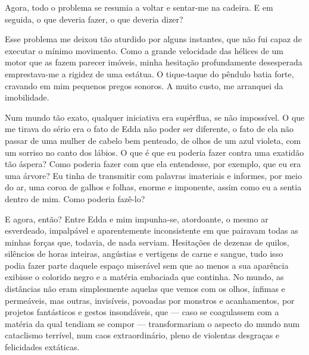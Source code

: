 Agora, todo o problema se resumia a voltar e sentar-me na cadeira. E em
seguida, o que deveria fazer, o que deveria dizer?

Esse problema me deixou tão aturdido por alguns instantes, que não fui capaz
de executar o mínimo movimento. Como a grande velocidade das hélices de um
motor que as fazem parecer imóveis, minha hesitação profundamente desesperada
emprestava-me a rigidez de uma estátua. O tique-taque do pêndulo batia forte,
cravando em mim pequenos pregos sonoros. A muito custo, me arranquei da
imobilidade. 


Num mundo tão exato, qualquer iniciativa era supérflua, se não impossível. O
que me tirava do sério era o fato de Edda não poder ser diferente, o fato de
ela não passar de uma mulher de cabelo bem penteado, de olhos de um azul
violeta, com um sorriso no canto dos lábios. O que é que eu poderia fazer
contra uma exatidão tão áspera? Como poderia fazer com que ela entendesse,
por exemplo, que eu era uma árvore? Eu tinha de transmitir com palavras
imateriais e informes, por meio do ar, uma coroa de galhos e folhas, enorme e
imponente, assim como eu a sentia dentro de mim. Como poderia fazê-lo?


E agora, então? Entre Edda e mim impunha-se, atordoante, o mesmo ar
esverdeado, impalpável e aparentemente inconsistente em que pairavam todas as
minhas forças que, todavia, de nada serviam. Hesitações de dezenas de quilos,
silêncios de horas inteiras, angústias e vertigens de carne e sangue, tudo
isso podia fazer parte daquele espaço miserável sem que ao menos a sua
aparência exibisse o colorido negro e a matéria embaciada que continha. No
mundo, as distâncias não eram simplesmente aquelas que vemos com os olhos,
ínfimas e permeáveis, mas outras, invisíveis, povoadas por monstros e
acanhamentos, por projetos fantásticos e gestos insondáveis, que --- caso se
coagulassem com a matéria da qual tendiam se compor --- transformariam o
aspecto do mundo num cataclismo terrível, num caos extraordinário, pleno de
violentas desgraças e felicidades extáticas.

